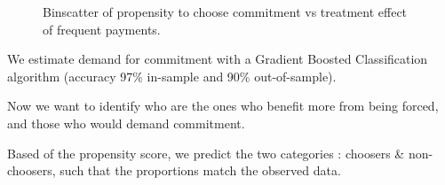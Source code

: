 \documentclass[oneside,11pt]{article}
\begin{document}
\begin{figure}[H]
\begin{center}
    \end{center}
     \scriptsize    Binscatter of propensity to choose commitment vs treatment effect of frequent payments.
\end{figure}



We estimate demand for commitment with a Gradient Boosted Classification algorithm (accuracy 97\% in-sample and 90\% out-of-sample).


Now we want to identify who are the ones who benefit more from being forced, and those who would demand commitment.



Based of the propensity score, we predict the two categories : choosers \& non-choosers, such that the proportions match the observed data.
\end{document}

